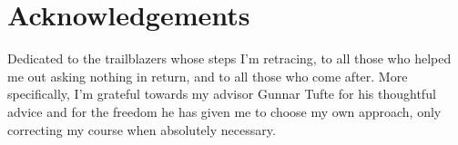 \vspace*{7cm}
\section*{Acknowledgements}
\begin{center}

  Dedicated to the trailblazers whose steps I'm retracing, to all those who
helped me out asking nothing in return, and to all those who come after. More
specifically, I'm grateful towards my advisor Gunnar Tufte for his thoughtful
advice and for the freedom he has given me to choose my own approach, only
correcting my course when absolutely necessary.
  
\end{center}

\cleardoublepage

